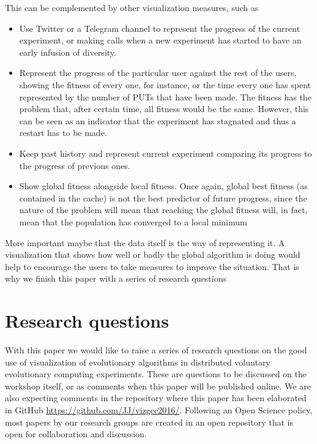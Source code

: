 \documentclass{sig-alternate}
\begin{document}
This can be complemented by other visualization measures, such as \begin{itemize}
\item Use Twitter or a Telegram channel to represent the progress of
  the current experiment, or making calls when a new experiment has
  started to have an early infusion of diversity.
\item Represent the progress of the particular user against the rest
  of the users, showing the fitness of every one, for instance, or the
  time every one has spent represented by the number of PUTs that have
  been made. The fitness has the problem that, after certain time, all
  fitness would be the same. However, this can be seen as an indicator
  that the experiment has stagnated and thus a restart has to be made.
\item Keep past history and represent current experiment comparing its
  progress to the progress of previous ones.
\item Show global fitness alongside local fitness. Once again, global
  best fitness (as contained in the cache) is not the best predictor
  of future progress, since the nature of the problem will mean that
  reaching the global fitness will, in fact, mean that the population
  has converged to a local minimum
\end{itemize}

More important maybe that the data itself is the way of representing
it. A visualization that shows how well or badly the global algorithm
is doing would help to encourage the users to take measures to improve
the situation. That is why we finish this paper with a series of
research questions

\section{Research questions}

With this paper we would like to raise a series of research questions
on the good use of visualization of evolutionary algorithms in
distributed voluntary evolutionary computing experiments. These are
questions to be discussed on the workshop itself, or as comments when
this paper will be published online. We are also expecting comments in
the repository where this paper has been elaborated in GitHub
\url{https://github.com/JJ/vizgec2016/}. Following an Open Science
policy, most papers by our research groups are created in an open
repository that is open for collaboration and discussion.
\end{document}
